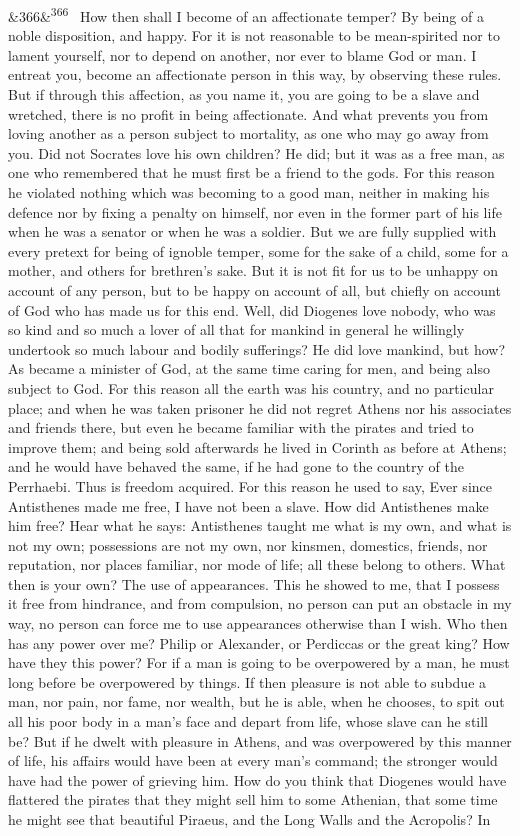 \documentclass[12pt]{article}
\newcommand{\para}[1][]{\par\noindent\ifx&#1&\else\textsuperscript{\footnotesize #1}~\fi}
\begin{document}
\para[366] How then shall I become of an affectionate temper? By being of a noble disposition, and happy. For it is not reasonable to be mean-spirited nor to lament yourself, nor to depend on another, nor ever to blame God or man. I entreat you, become an affectionate person in this way, by observing these rules. But if through this affection, as you name it, you are going to be a slave and wretched, there is no profit in being affectionate. And what prevents you from loving another as a person subject to mortality, as one who may go away from you. Did not Socrates love his own children? He did; but it was as a free man, as one who remembered that he must first be a friend to the gods. For this reason he violated nothing which was becoming to a good man, neither in making his defence nor by fixing a penalty on himself, nor even in the former part of his life when he was a senator or when he was a soldier. But we are fully supplied with every pretext for being of ignoble temper, some for the sake of a child, some for a mother, and others for brethren's sake. But it is not fit for us to be unhappy on account of any person, but to be happy on account of all, but chiefly on account of God who has made us for this end. Well, did Diogenes love nobody, who was so kind and so much a lover of all that for mankind in general he willingly undertook so much labour and bodily sufferings? He did love mankind, but how? As became a minister of God, at the same time caring for men, and being also subject to God. For this reason all the earth was his country, and no particular place; and when he was taken prisoner he did not regret Athens nor his associates and friends there, but even he became familiar with the pirates and tried to improve them; and being sold afterwards he lived in Corinth as before at Athens; and he would have behaved the same, if he had gone to the country of the Perrhaebi. Thus is freedom acquired. For this reason he used to say, Ever since Antisthenes made me free, I have not been a slave. How did Antisthenes make him free? Hear what he says: Antisthenes taught me what is my own, and what is not my own; possessions are not my own, nor kinsmen, domestics, friends, nor reputation, nor places familiar, nor mode of life; all these belong to others. What then is your own? The use of appearances. This he showed to me, that I possess it free from hindrance, and from compulsion, no person can put an obstacle in my way, no person can force me to use appearances otherwise than I wish. Who then has any power over me? Philip or Alexander, or Perdiccas or the great king? How have they this power? For if a man is going to be overpowered by a man, he must long before be overpowered by things. If then pleasure is not able to subdue a man, nor pain, nor fame, nor wealth, but he is able, when he chooses, to spit out all his poor body in a man's face and depart from life, whose slave can he still be? But if he dwelt with pleasure in Athens, and was overpowered by this manner of life, his affairs would have been at every man's command; the stronger would have had the power of grieving him. How do you think that Diogenes would have flattered the pirates that they might sell him to some Athenian, that some time he might see that beautiful Piraeus, and the Long Walls and the Acropolis? In 
\end{document}
